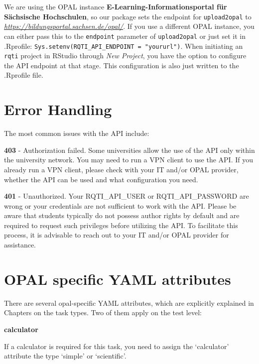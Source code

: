 \documentclass[twoside]{tufte-book}
\begin{document}
We are using the OPAL instance \textbf{E-Learning-Informationsportal für Sächsische Hochschulen}, so our package sets the endpoint for \texttt{upload2opal} to \emph{\url{https://bildungsportal.sachsen.de/opal/}}. If you use a different OPAL instance, you can either pass this to the \texttt{endpoint} parameter of \texttt{upload2opal} or just set it in .Rprofile: \texttt{Sys.setenv(RQTI\_API\_ENDPOINT\ =\ "yoururl")}. When initiating an \texttt{rqti} project in RStudio through \emph{New Project}, you have the option to configure the API endpoint at that stage. This configuration is also just written to the .Rprofile file.

\section{Error Handling}\label{error-handling}

The most common issues with the API include:

\textbf{403} - Authorization failed. Some universities allow the use of the API only within the university network. You may need to run a VPN client to use the API.
If you already run a VPN client, please check with your IT and/or OPAL provider, whether the API can be used and what configuration you need.

\textbf{401} - Unauthorized. Your RQTI\_API\_USER or RQTI\_API\_PASSWORD are wrong or your credentials are not sufficient to work with the API. Please be aware that students typically do not possess author rights by default and are required to request such privileges before utilizing the API. To facilitate this process, it is advisable to reach out to your IT and/or OPAL provider for assistance.

\section{OPAL specific YAML attributes}\label{opal-specific-YAML-attributes}

There are several opal-specific YAML attributes, which are explicitly explained in Chapters on the task types. Two of them apply on the test level:

\noindent\textbf{calculator}\label{calculator-1}

If a calculator is required for this task, you need to assign the `calculator' attribute the type `simple' or `scientific'.
\end{document}
